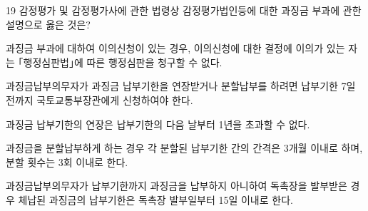 \begin{question}{19}
감정평가 및 감정평가사에 관한 법령상 감정평가법인등에 대한 과징금 부과에 관한 설명으로 옳은 것은?
\begin{choices}
  \item 과징금 부과에 대하여 이의신청이 있는 경우, 이의신청에 대한 결정에 이의가 있는 자는 ｢행정심판법｣에 따른 행정심판을 청구할 수 없다.
  \item 과징금납부의무자가 과징금 납부기한을 연장받거나 분할납부를 하려면 납부기한 7일 전까지 국토교통부장관에게 신청하여야 한다.
  \item 과징금 납부기한의 연장은 납부기한의 다음 날부터 1년을 초과할 수 없다.
  \item 과징금을 분할납부하게 하는 경우 각 분할된 납부기한 간의 간격은 3개월 이내로 하며, 분할 횟수는 3회 이내로 한다.
  \item 과징금납부의무자가 납부기한까지 과징금을 납부하지 아니하여 독촉장을 발부받은 경우 체납된 과징금의 납부기한은 독촉장 발부일부터 15일 이내로 한다.
\end{choices}
\end{question}
